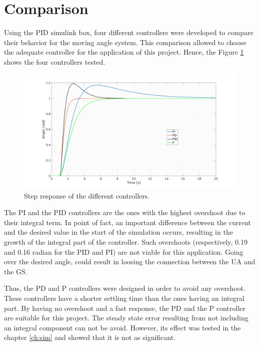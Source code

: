 \section{Comparison}
Using the PID simulink box, four different controllers were developed to compare their behavior for the moving angle system. This comparison allowed to choose the adequate controller for the application of this project. Hence, the Figure \ref{fig:comp_pid} shows the four controllers tested.

\begin{figure}[H]
\centerline{
\includegraphics[scale=0.35]{figures/full_comp.png}}
\caption{Step response of the different controllers.}
\label{fig:comp_pid}
\end{figure}

The PI and the PID controllers are the ones with the highest overshoot due to their integral term. In point of fact, an important difference between the current and the desired value in the start of the simulation occurs, resulting in the growth of the integral part of the controller. 
Such overshoots (respectively, 0.19 and 0.16 radian for the PID and PI) are not viable for this application. Going over the desired angle, could result in loosing the connection between the UA and the GS.

Thus, the PD and P controllers were designed in order to avoid any overshoot. These controllers have a shorter settling time than the ones having an integral part. By having no overshoot and a fast response, the PD and the P controller are suitable for this project. The steady state error resulting from not including an integral component can not be avoid. However, its effect was tested in the chapter \ref{ch:sim} and showed that it is not as significant.

\vspace{5mm}

